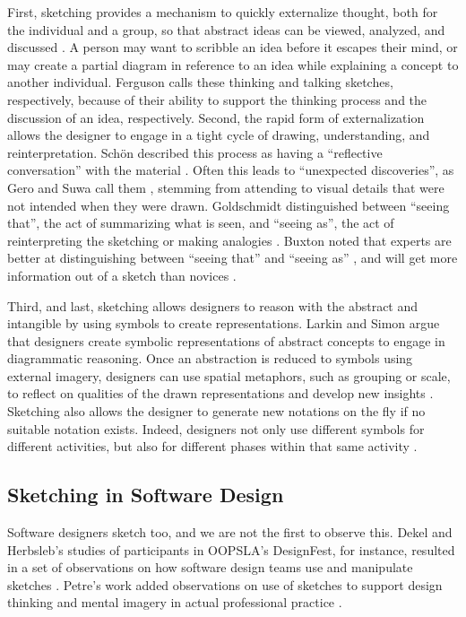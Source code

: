 First, sketching provides a mechanism to quickly externalize thought, both for the individual and a group, so that abstract ideas can be viewed, analyzed, and discussed \citep{Petrea}. A person may want to scribble an idea before it escapes their mind, or may create a partial diagram in reference to an idea while explaining a concept to another individual. Ferguson \citep{Ferguson} calls these thinking and talking sketches, respectively, because of their ability to support the thinking process and the discussion of an idea, respectively. 
Second, the rapid form of externalization allows the designer to engage in a tight cycle of drawing, understanding, and reinterpretation. Sch\"{o}n described this process as having a ``reflective conversation'' with the material \citep{schon}. Often this leads to ``unexpected discoveries'', as Gero and Suwa call them \citep{Suwa}, stemming from attending to visual details that were not intended when they were drawn. Goldschmidt distinguished between ``seeing that'', the act of summarizing what is seen, and ``seeing as'', the act of reinterpreting the sketching or making analogies \citep{Goldschmidt}. Buxton noted that experts are better at distinguishing between ``seeing that'' and ``seeing as'' \citep{Buxton}, and will get more information out of a sketch than novices \citep{Goldschmidt}. 

Third, and last, sketching allows designers to reason with the abstract and intangible by using symbols to create representations. Larkin and Simon argue that designers create symbolic representations of abstract concepts to engage in diagrammatic reasoning. Once an abstraction is reduced to symbols using external imagery, designers can use spatial metaphors, such as grouping or scale, to reflect on qualities of the drawn representations and develop new insights \citep{Larkin}. Sketching also allows the designer to generate new notations on the fly if no suitable notation exists. Indeed, designers not only use different symbols for different activities, but also for different phases within that same activity \citep{Goel}. 

\subsection{Sketching in Software Design}
\label{sketching:2}
Software designers sketch too, and we are not the first to observe this. Dekel and Herbsleb's studies of participants in OOPSLA's DesignFest, for instance, resulted in a set of observations on how software design teams use and manipulate sketches \citep{Dekela}. Petre's work added observations on use of sketches to support design thinking and mental imagery in actual professional practice \citep{Petre}.

